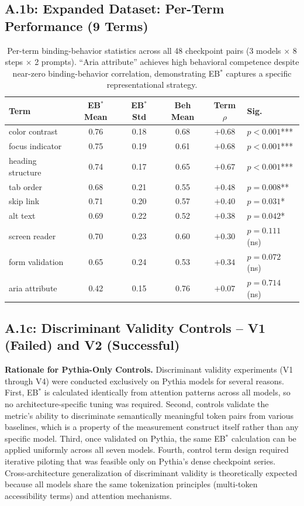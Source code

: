 \documentclass[10pt]{article} %
\begin{document}
\subsection*{A.1b: Expanded Dataset: Per-Term Performance (9 Terms)}

\begin{table}[H]
\centering
\small
\begin{tabular}{|l|c|c|c|c|l|}
\hline
\textbf{Term} & \textbf{EB$^*$ Mean} & \textbf{EB$^*$ Std} & \textbf{Beh Mean} & \textbf{Term $\rho$} & \textbf{Sig.} \\
\hline
color contrast & 0.76 & 0.18 & 0.68 & $+0.68$ & $p<0.001$*** \\
focus indicator & 0.75 & 0.19 & 0.61 & $+0.68$ & $p<0.001$*** \\
heading structure & 0.74 & 0.17 & 0.65 & $+0.67$ & $p<0.001$*** \\
tab order & 0.68 & 0.21 & 0.55 & $+0.48$ & $p=0.008$** \\
skip link & 0.71 & 0.20 & 0.57 & $+0.40$ & $p=0.031$* \\
alt text & 0.69 & 0.22 & 0.52 & $+0.38$ & $p=0.042$* \\
screen reader & 0.70 & 0.23 & 0.60 & $+0.30$ & $p=0.111$ (ns) \\
form validation & 0.65 & 0.24 & 0.53 & $+0.34$ & $p=0.072$ (ns) \\
aria attribute & 0.42 & 0.15 & 0.76 & $+0.07$ & $p=0.714$ (ns) \\
\hline
\end{tabular}
\caption{Per-term binding-behavior statistics across all 48 checkpoint pairs (3 models $\times$ 8 steps $\times$ 2 prompts). ``Aria attribute'' achieves high behavioral competence despite near-zero binding-behavior correlation, demonstrating EB$^*$ captures a specific representational strategy.}
\label{tab:a1b_nine_term}
\end{table}

\subsection*{A.1c: Discriminant Validity Controls -- V1 (Failed) and V2 (Successful)}
\label{sec:a1c_v1v2}

\noindent\textbf{Rationale for Pythia-Only Controls.} Discriminant validity experiments (V1 through V4) were conducted exclusively on Pythia models for several reasons. First, EB$^*$ is calculated identically from attention patterns across all models, so no architecture-specific tuning was required. Second, controls validate the metric's ability to discriminate semantically meaningful token pairs from various baselines, which is a property of the measurement construct itself rather than any specific model. Third, once validated on Pythia, the same EB$^*$ calculation can be applied uniformly across all seven models. Fourth, control term design required iterative piloting that was feasible only on Pythia's dense checkpoint series. Cross-architecture generalization of discriminant validity is theoretically expected because all models share the same tokenization principles (multi-token accessibility terms) and attention mechanisms.
\end{document}
